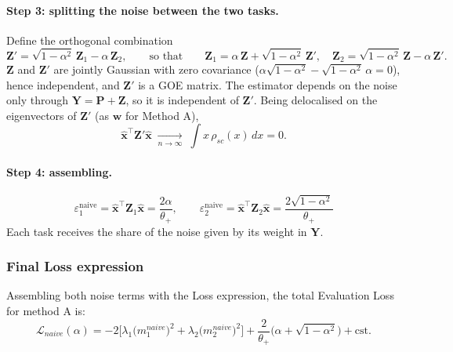 \paragraph{Step 3: splitting the noise between the two tasks.}
Define the orthogonal combination
\begin{equation}
  \mathbf{Z}' = \sqrt{1-\alpha^2}\,\mathbf{Z}_1 - \alpha\,\mathbf{Z}_2 ,
  \qquad\text{so that}\qquad
  \mathbf{Z}_1 = \alpha\,\mathbf{Z} + \sqrt{1-\alpha^2}\,\mathbf{Z}',
  \quad
  \mathbf{Z}_2 = \sqrt{1-\alpha^2}\,\mathbf{Z} - \alpha\,\mathbf{Z}' .
\end{equation}
$\mathbf{Z}$ and $\mathbf{Z}'$ are jointly Gaussian with zero covariance
($\alpha\sqrt{1-\alpha^2} - \sqrt{1-\alpha^2}\,\alpha = 0$), hence independent, and $\mathbf{Z}'$ is a GOE matrix.
The estimator depends on the noise only through $\mathbf{Y} = \mathbf{P} + \mathbf{Z}$, so it is independent of $\mathbf{Z}'$.
Being delocalised on the eigenvectors of $\mathbf{Z}'$ (as $\boldsymbol{w}$ for Method A),
\begin{equation}
  \hat{\boldsymbol{x}}^\top\mathbf{Z}'\hat{\boldsymbol{x}} \;\xrightarrow[n\to\infty]{}\; \int x\,\rho_{sc}(x)\,dx = 0 .
\end{equation}

\paragraph{Step 4: assembling.}
\begin{equation}
  \boxed{\;
  \varepsilon_1^{\mathrm{naive}} = \hat{\boldsymbol{x}}^\top\mathbf{Z}_1\hat{\boldsymbol{x}} = \frac{2\alpha}{\theta_+},
  \qquad
  \varepsilon_2^{\mathrm{naive}} = \hat{\boldsymbol{x}}^\top\mathbf{Z}_2\hat{\boldsymbol{x}} = \frac{2\sqrt{1-\alpha^2}}{\theta_+}
  \;}
\end{equation}
Each task receives the share of the noise given by its weight in $\mathbf{Y}$.

\subsubsection{Final Loss expression}
Assembling both noise terms with the Loss expression, the total Evaluation Loss for method A is:
\begin{equation}
  \mathcal{L}_{naive}(\alpha) = 
  - 2\Big[\lambda_1 \big(m_1^{naive}\big)^2 + \lambda_2 \big(m_2^{naive}\big)^2  \Big] + \frac{2}{\theta_+}\big( \alpha + \sqrt{1 - \alpha^2} \big) + \mathrm{cst}.
\end{equation}

